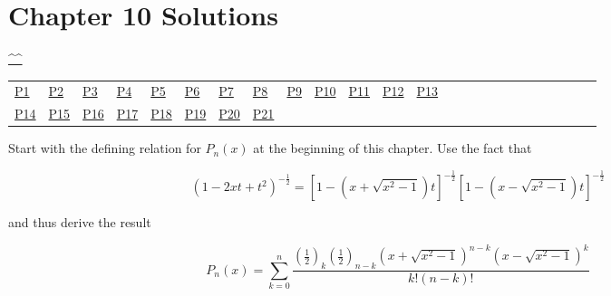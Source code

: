 \section{Chapter 10 Solutions}
\begin{center}\hyperref[toc]{\^{}\^{}}\end{center}
\begin{center}\begin{tabular}{lllllllllllllllllllllllll}
\hyperref[problem1chapter10]{P1} & \hyperref[problem2chapter10]{P2} & \hyperref[problem3chapter10]{P3} & \hyperref[problem4chapter10]{P4} & \hyperref[problem5chapter10]{P5} & \hyperref[problem6chapter10]{P6} & \hyperref[problem7chapter10]{P7} & \hyperref[problem8chapter10]{P8} & \hyperref[problem9chapter10]{P9} & \hyperref[problem10chapter10]{P10} & \hyperref[problem11chapter10]{P11} & \hyperref[problem12chapter10]{P12} & \hyperref[problem13chapter10]{P13} \\
\hyperref[problem14chapter10]{P14} & \hyperref[problem15chapter10]{P15} & \hyperref[problem16chapter10]{P16} & \hyperref[problem17chapter10]{P17} & \hyperref[problem18chapter10]{P18} & \hyperref[problem19chapter10]{P19} & \hyperref[problem20chapter10]{P20} & \hyperref[problem21chapter10]{P21} 
\end{tabular}\end{center}
\setcounter{problem}{0}
\setcounter{solution}{0}
\begin{problem}\label{problem1chapter10}
Start with the defining relation for $P_n(x)$ at the beginning of this chapter. Use the fact that

$$(1-2xt+t^2)^{-\frac{1}{2}} = [1 - (x + \sqrt{x^2-1})t]^{-\frac{1}{2}} [1-(x-\sqrt{x^2-1})t]^{-\frac{1}{2}}$$

and thus derive the result

$$P_n(x) = \displaystyle\sum_{k=0}^n \dfrac{(\frac{1}{2})_k (\frac{1}{2})_{n-k} (x + \sqrt{x^2-1})^{n-k}(x - \sqrt{x^2-1})^k}{k! (n-k)!}$$
\end{problem}
